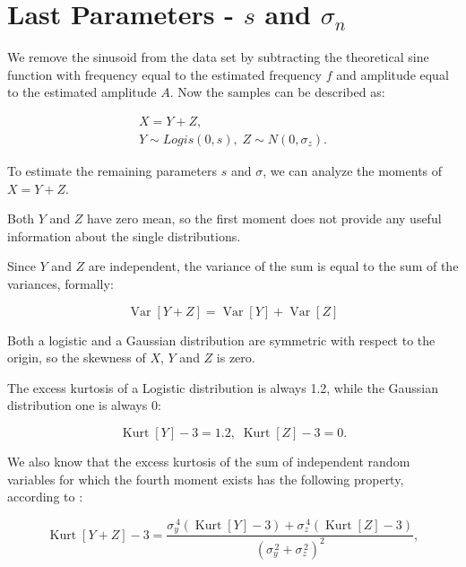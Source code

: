\section{Last Parameters - $s$ and $\sigma_n$}
\label{sec:variances}

We remove the sinusoid from the data set by subtracting the theoretical sine function with frequency equal to the estimated frequency $f$ and amplitude equal to the estimated amplitude $A$.
Now the samples can be described as:

\begin{equation*}
    \begin{gathered}
        X = Y + Z, \\
        Y \sim Logis(0, s), \; Z \sim N(0, \sigma_{z}).
    \end{gathered}
\end{equation*}

To estimate the remaining parameters $s$ and $\sigma$, we can analyze the moments of $X = Y + Z$.

Both $Y$ and $Z$ have zero mean, so the first moment does not provide any useful information about the single distributions.

Since $Y$ and $Z$ are independent, the variance of the sum is equal to the sum of the variances, formally:

\begin{equation}
    \operatorname{Var}[Y+Z] = \operatorname{Var}[Y] + \operatorname{Var}[Z]
    \label{eq:variances}
\end{equation}

Both a logistic and a Gaussian distribution are symmetric with respect to the origin, so the skewness of $X$, $Y$ and $Z$ is zero.

The excess kurtosis of a Logistic distribution is always \num{1.2}, while the Gaussian distribution one is always \num{0}:

\begin{equation*}
    \operatorname{Kurt}[Y] - 3 = 1.2,\; \operatorname{Kurt}[Z] - 3 = 0.
\end{equation*}

We also know that the excess kurtosis of the sum of independent random variables for which the fourth moment exists has the following property, according to \cite{wiki:kurtosis}:

\begin{equation*}
    \operatorname{Kurt}[Y+Z] - 3 = \frac{\sigma_y^{\,4} (\operatorname{Kurt}[Y] - 3) + \sigma_z^{\,4} (\operatorname{Kurt}[Z] - 3)}{(\sigma_y^{\,2} + \sigma_z^{\,2})^2},
\end{equation*}


